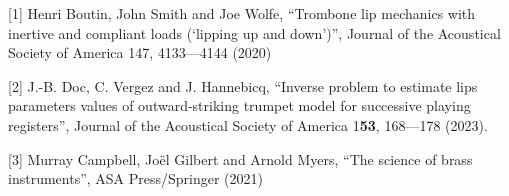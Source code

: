   \sectionreferences{}[1] Henri Boutin, John Smith and Joe Wolfe, “Trombone lip 
  mechanics with inertive and compliant loads (‘lipping up and down’)”, Journal 
  of the Acoustical Society of America 147, 4133—4144 (2020) 

  [2] J.-B. Doc, C. Vergez and J. Hannebicq, “Inverse problem to estimate lips 
  parameters values of outward-striking trumpet model for successive playing 
  registers”, Journal of the Acoustical Society of America 1\textbf{53}, 
  168—178 (2023). 

  [3] Murray Campbell, Joël Gilbert and Arnold Myers, “The science of brass 
  instruments”, ASA Press/Springer (2021) 